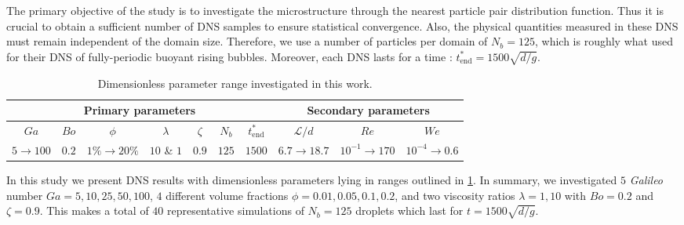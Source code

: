The primary objective of the study is to investigate the microstructure through the nearest particle pair distribution function.
Thus it is crucial to obtain a sufficient number of DNS samples to ensure statistical convergence. 
Also, the physical quantities measured in these DNS must remain independent of the domain size. 
Therefore, we use a number of particles per domain of $N_b = 125$, which is roughly what \citet{hidman2023assessing} used for their DNS of fully-periodic buoyant rising bubbles.
Moreover, each DNS lasts for a time : $t^*_\text{end} = 1500 \sqrt{d/g}$.
\begin{table}[h!]
    \centering
    \caption{Dimensionless parameter range investigated in this work.}
    \begin{tabular}{|ccccccc|ccc|}\hline
        \multicolumn{7}{|c|}{Primary parameters}&\multicolumn{3}{|c|}{Secondary parameters}\\\hline\hline
        $Ga$&$Bo$&$\phi$&$\lambda$&$\zeta$&$N_b$&$t^*_\text{end}$&$\mathcal{L}/d$&$Re$&$We$\\ \hline
        $5\rightarrow 100$&$0.2$&$1\% \rightarrow 20\%$&$10$ \& $1$&$0.9$&$125$&$1500$&$6.7\to 18.7$&$10^{-1}\to 170$&$10^{-4}\to 0.6$\\ \hline
    \end{tabular}
    \label{tab:simulations}
\end{table}
In this study we present DNS results with dimensionless parameters lying in ranges outlined in \ref{tab:simulations}.
In summary, we investigated $5$ \textit{Galileo} number $Ga = 5,10,25,50,100$, $4$ different volume fractions $\phi = 0.01,0.05,0.1,0.2$, and two viscosity ratios $\lambda =1,10$ with $Bo = 0.2$ and $\zeta = 0.9$. 
This makes a total of $40$ representative simulations of $N_b = 125$ droplets which last for $t= 1500 \sqrt{d/g}$. 

